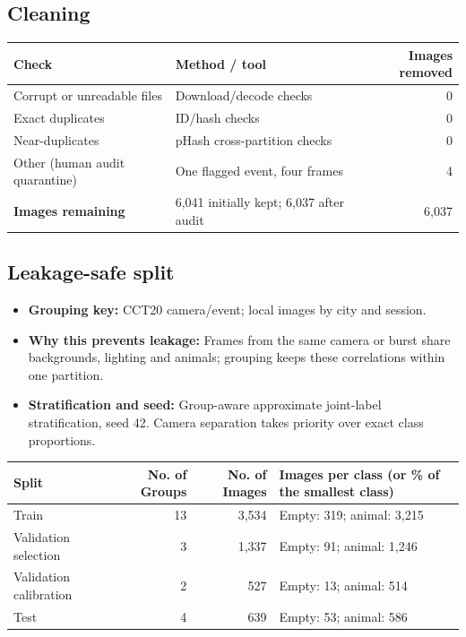 \documentclass[11pt,a4paper]{article}
\begin{document}
\subsection{Cleaning}

\begin{tabularx}{\linewidth}{@{}l Y r@{}}
\toprule
Check & Method / tool & Images removed \\
\midrule
Corrupt or unreadable files & Download/decode checks & 0 \\
Exact duplicates & ID/hash checks & 0 \\
Near-duplicates & pHash cross-partition checks & 0 \\
Other (human audit quarantine) & One flagged event, four frames & 4 \\
\midrule
\textbf{Images remaining} & 6,041 initially kept; 6,037 after audit & 6,037 \\
\bottomrule
\end{tabularx}

\subsection{Leakage-safe split}

\begin{itemize}[leftmargin=1.2em]
  \item \textbf{Grouping key:} CCT20 camera/event; local images by city and session.
  \item \textbf{Why this prevents leakage:} Frames from the same camera or burst share backgrounds, lighting and animals; grouping keeps these correlations within one partition.
  \item \textbf{Stratification and seed:} Group-aware approximate joint-label stratification, seed 42. Camera separation takes priority over exact class proportions.
\end{itemize}

\begin{tabularx}{\linewidth}{@{}l r r Y@{}}
\toprule
Split & No. of Groups & No. of Images & Images per class (or \% of the smallest class) \\
\midrule
Train & 13 & 3,534 & Empty: 319; animal: 3,215 \\
Validation selection & 3 & 1,337 & Empty: 91; animal: 1,246 \\
Validation calibration & 2 & 527 & Empty: 13; animal: 514 \\
Test & 4 & 639 & Empty: 53; animal: 586 \\
\bottomrule
\end{tabularx}
\end{document}
